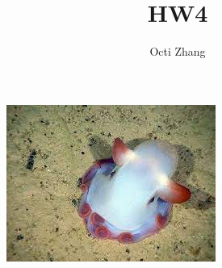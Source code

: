 \documentclass{article}
\title{HW4}
\author{Octi Zhang}
\begin{document}
\maketitle
\renewcommand{\abstractname}{OCTIPUS}
\begin{abstract}
\end{abstract}
\begin{figure}[!h]
    \centering\includegraphics[width=0.4\linewidth]{octipus.jpeg}
\end{figure}





\end{document}
